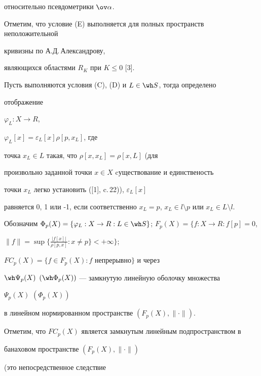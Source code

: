 относительно псевдометрики $\ov \alpha$.





Отметим, что условие (E) выполняется для полных пространств неположительной


кривизны по А.Д.\,Александрову,


являющихся областями $R_{K}$ при $K \leq 0$ [3]. 





Пусть выполняются условия (C), (D) и $L \in \wh S$, тогда определено


отображение 


$\varphi_{L} : X \rightarrow R$,


$\varphi _{L}[x] = \varepsilon_{L}[x] \rho[p,x_{L}]$, где


точка $x_{L} \in L$ такая, что $\rho [x,x_{L}] = \rho [x,L]$ (для


произвольно заданной точки $x \in X$ cуществование и единственость


точки $x_{L}$ легко установить ([1], c.\,22)), $\varepsilon_{L}[x]$


равняется 0, 1 или -1, если соответственно $x_{L} =p$, $x_{L} \in


l\setminus p$ или $x_{L} \in L\setminus l$. 





Обозначим $\Phi_{p}(X) = \{\varphi _{L} : X \rightarrow R : L \in


\wh S \}$; $F_{p}(X) = \{ f : X \rightarrow R :  f[p] = 0$,


$\|f\| = \sup \{\frac{|f[x]|}{\rho [p,x]} : x \neq p \} < +\infty\}$;


$FC_{p}(X) = \{ f  \in F_{p}(X) : f$ непрерывно$\}$ и через


$\wh \Psi_{p}(X)$ $(\wh \Phi_{p}(X))$ --- замкнутую линейную оболочку множества


$\Psi_{p}(X)$ $(\Phi_{p}(X))$ 


в линейном нормированном пространстве $(F_{p}(X), \|\cdot\|)$.








Отметим, что $FC_{p}(X)$ является замкнутым линейным подпространством в


банаховом пространстве $(F_{p}(X), \|\cdot\|)$


(это непосредственное следствие


